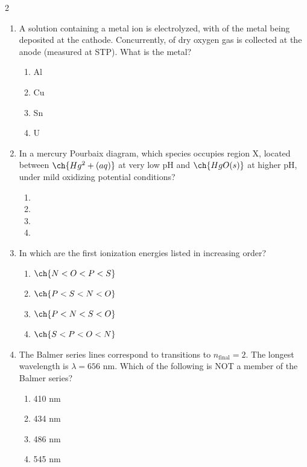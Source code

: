 \documentclass[10pt,letterpaper]{article}
\begin{document}
\begin{multicols*}{2}
\begin{enumerate}
    \item A solution containing a metal ion is electrolyzed, with  of the metal being deposited at the cathode. Concurrently,  of dry oxygen gas is collected at the anode (measured at STP). What is the metal?
    \begin{enumerate}[label=(\textsubscript{\Alph*})]
        \item Al
        \item Cu
        \item Sn
        \item U
    \end{enumerate}

    \item In a mercury Pourbaix diagram, which species occupies region X, located between $\ch{Hg^2+(aq)}$ at very low pH and $\ch{HgO(s)}$ at higher pH, under mild oxidizing potential conditions?
    \begin{enumerate}[label=(\textsubscript{\Alph*})]
        \item {}
        \item {}
        \item {}
        \item {}
    \end{enumerate}

    \item In which are the first ionization energies listed in increasing order?
    \begin{enumerate}[label=(\textsubscript{\Alph*})]
        \item $\ch{N < O < P < S}$
        \item $\ch{P < S < N < O}$
        \item $\ch{P < N < S < O}$
        \item $\ch{S < P < O < N}$
    \end{enumerate}

    \item The Balmer series lines correspond to transitions to $n_{\text{final}} = 2$. The longest wavelength is $\lambda = 656\text{ nm}$. Which of the following is NOT a member of the Balmer series?
    \begin{enumerate}[label=(\textsubscript{\Alph*})]
        \item 410 nm
        \item 434 nm
        \item 486 nm
        \item 545 nm
    \end{enumerate}


\end{enumerate}
\end{multicols*}
\end{document}
